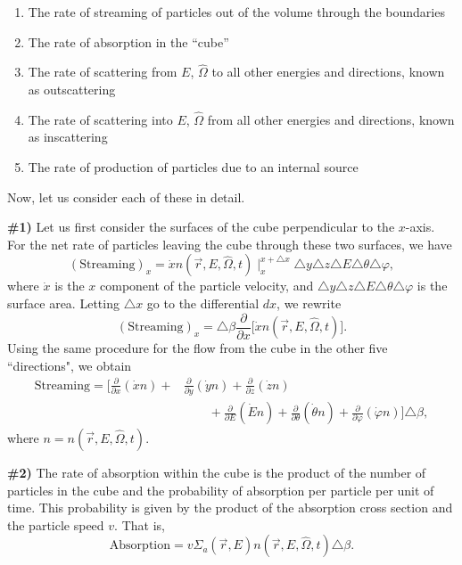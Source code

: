 \documentclass[12pt]{article}
\newcommand{\rvec}{\ensuremath{\vec{r}}}
\newcommand{\omvec}{\ensuremath{\hat{\Omega}}}
\begin{document}
\begin{enumerate}
  \item The rate of streaming of particles out of the volume through the boundaries
  \item The rate of absorption in the \enquote{cube}
  \item The rate of scattering from $E$, $\omvec$ to all other energies and directions, known as outscattering
  \item The rate of scattering into $E$, $\omvec$ from all other energies and
 directions, known as inscattering
  \item The rate of production of particles due to an internal source
\end{enumerate}  

 Now, let us consider each of these in detail.
 
 \textbf{\#1)} Let us first consider the surfaces of the cube perpendicular to the $x$-axis. For the net rate
of particles leaving the cube through these two surfaces, we have
\begin{equation*}
(\textrm{Streaming})_x = \dot x n(\rvec,E,\omvec,t)\mid_x^{x+\triangle x}
\triangle y\triangle z\triangle E\triangle \theta \triangle\varphi,
\end{equation*}
 where $\dot x$ is the $x$ component of the particle velocity,
and 
$\triangle y\triangle z\triangle E\triangle\theta\triangle \varphi$ is the surface area. Letting $\triangle x$ go to
the differential $dx$, we rewrite
\begin{equation*}
(\textrm{Streaming})_x = \triangle \beta \frac{\partial}{\partial x}\big[
\dot x n(\rvec,E,\omvec,t)\big].
\end{equation*}
 Using the same procedure for the flow from the cube in the other five ``directions", we obtain
\begin{align*}
\textrm{Streaming} =
\bigg[ \frac{\partial}{\partial x}(\dot x n) + &
\frac{\partial}{\partial y}(\dot y n) +\frac{\partial}{\partial z}(\dot z n) \\
&\quad\quad + \frac{\partial}{\partial E}(\dot E n) + \frac{\partial}{\partial \theta}(\dot \theta n) +
\frac{\partial}{\partial \varphi}(\dot \varphi n)\bigg] \triangle \beta,
\end{align*}
 where $n = n(\rvec,E,\omvec,t)$.


\textbf{\#2)} The rate of absorption within the cube is the product of the number of particles in the cube
and the probability of absorption per particle per unit of time. This probability is given by
the product of the absorption cross section and the particle speed $v$. That is,
\begin{equation*}
\textrm{Absorption} = v\Sigma_a(\rvec,E)n(\rvec ,E,\omvec,t)\triangle \beta.
\end{equation*}
\end{document}

